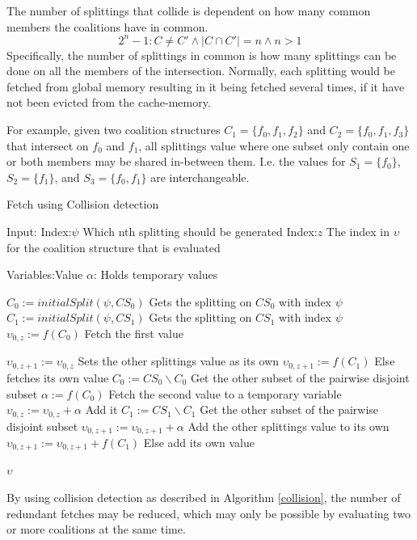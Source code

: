 \documentclass{llncs}
\begin{document}
The number of splittings that collide is dependent on how many common members the coalitions have in common.
\begin{displaymath}2^{n}-1:C\neq C'\wedge |C \cap C'| = n \wedge n > 1 \end{displaymath}
Specifically, the number of splittings in common is how many splittings
can be done on all the members of the intersection. Normally, each splitting would be fetched from global memory resulting in it being fetched several times, if it have not been evicted from the cache-memory.

For example, given two coalition structures $C_1 =\{f_0,f_1,f_2\}$ and $C_2 =\{f_0,f_1,f_3\}$ that intersect on $f_0$ and $f_1$, all splittings value where one subset only contain one or both members may be shared in-between them. I.e. the values for $S_1 = \{f_0\}$, $S_2 = \{f_1\}$, and $S_3 = \{f_0,f_1\}$ are interchangeable.

\begin{algorithm}[htbp]
\caption{Fetch using Collision detection \label{collision}}
Input:
Index:$\psi$ \hfill Which nth splitting should be generated
Index:$z$ \hfill The index in $\upsilon$ for the coalition structure that is evaluated 

Variables:Value $\alpha $: \hfill Holds temporary values

\begin{algorithmic}[1]
    \STATE $C_{0} := initialSplit(\psi,CS_0)$ \label{lst:line:startcol} \hfill Gets the splitting on $CS_0$ with index $\psi$
    \STATE $C_{1} := initialSplit(\psi,CS_1)$ \hfill Gets the splitting on $CS_1$ with index $\psi$
    \STATE $\upsilon_{0,z} := f(C_{0})$ \label{lst:line:fetch} \hfill Fetch the first value
    
     \label{lst:line:firstif} 
      \STATE $\upsilon_{0,z+1} := \upsilon_{0,z}$ \hfill Sets the other splittings value as its own
      \ELSE
      \STATE $\upsilon_{0,z+1} := f(C_{1})$ \hfill Else fetches its own value
     \ENDIF \label{lst:line:firstifend}
    \STATE $C_{0} := CS_0\backslash C_{0}$ \label{lst:line:startend} \hfill Get the other subset of the pairwise disjoint subset
    \STATE $\alpha := f(C_{0})$ \hfill Fetch the second value to a temporary variable
    \STATE $\upsilon_{0,z} := \upsilon_{0,z}  + \alpha$ \label{lst:line:endend} \hfill Add it
    \STATE $C_{1} := CS_1\backslash C_{1}$ \hfill Get the other subset of the pairwise disjoint subset
      \STATE $\upsilon_{0,z+1} := \upsilon_{0,z+1}  + \alpha$ \hfill Add the other splittings value to its own
    \ELSE
      \STATE $\upsilon_{0,z+1} := \upsilon_{0,z+1} + f(C_{1})$ \hfill Else add its own value
    \ENDIF
    
\RETURN $\upsilon$
\end{algorithmic}
\end{algorithm}
By using collision detection as described in Algorithm \ref{collision}, the number of redundant fetches may be reduced,
which may only be possible by evaluating two or more coalitions at the same time. 
\end{document}
